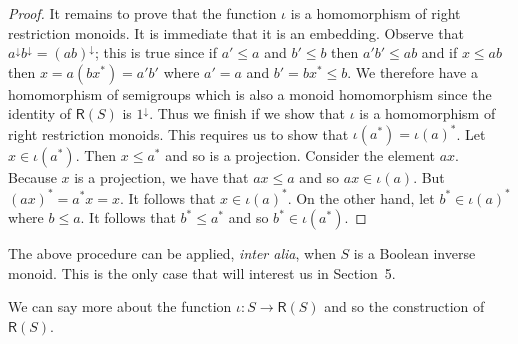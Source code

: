 \documentclass[a4paper]{amsart}
\begin{document}
\begin{proof}
It remains to prove that the function $\iota$ is a homomorphism of right restriction monoids.
It is immediate that it is an embedding.
Observe that $a^{\downarrow}b^{\downarrow} = (ab)^{\downarrow}$;
this is true since if $a' \leq a$ and $b' \leq b$ then $a'b' \leq ab$
and if $x \leq ab$ then $x = a(bx^{\ast}) = a'b'$
where $a' = a$ and $b'= bx^{\ast} \leq b$. 
We therefore have a homomorphism of semigroups
which is also a monoid homomorphism since the identity of $\mathsf{R}(S)$ is $1^{\downarrow}$.
Thus we finish if we show that $\iota$ is a homomorphism of right restriction monoids.
This requires us to show that $\iota (a^{\ast}) = \iota (a)^{\ast}$.
Let $x \in \iota (a^{\ast})$.
Then $x \leq a^{\ast}$ and so is a projection.
Consider the element $ax$.
Because $x$ is a projection, we have that $ax \leq a$ and so $ax \in \iota (a)$.
But $(ax)^{\ast} = a^{\ast}x = x$.
It follows that $x \in \iota (a)^{\ast}$.
On the other hand, let $b^{\ast} \in \iota (a)^{\ast}$ where $b \leq a$.
It follows that $b^{\ast} \leq a^{\ast}$ and so $b^{\ast} \in \iota (a^{\ast})$. 
\end{proof}

The above procedure can be applied, {\em inter alia}, when $S$ is a Boolean inverse monoid.
This is the only case that will interest us in Section~5.

We can say more about the function $\iota \colon S \rightarrow \mathsf{R}(S)$
and so the construction of $\mathsf{R}(S)$. 
\end{document}
